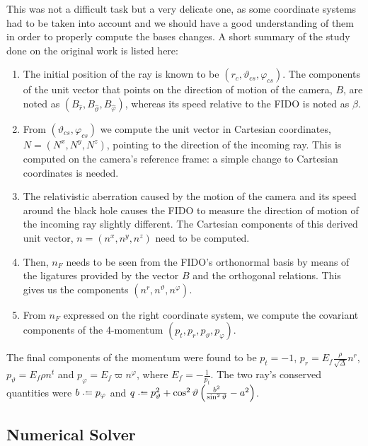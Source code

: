 This was not a difficult task but a very delicate one, as some coordinate systems had to be taken into account and we should have a good understanding of them in order to properly compute the bases changes. A short summary of the study done on the original work is listed here:
\begin{enumerate}
	\item The initial position of the ray is known to be $(r_c, \vartheta_{cs}, \varphi_{cs})$. The components of the unit vector that points on the direction of motion of the camera, $B$, are noted as $(B_{\widehat{r}}, B_{\widehat{\vartheta}}, B_{\widehat{\varphi}})$, whereas its speed relative to the \ac{FIDO} is noted as $\beta$.
	\item From $(\vartheta_{cs}, \varphi_{cs})$ we compute the unit vector in Cartesian coordinates, $N = (N^x, N^y, N^z)$, pointing to the direction of the incoming ray. This is computed on the camera's reference frame: a simple change to Cartesian coordinates is needed.
	\item The relativistic aberration caused by the motion of the camera and its speed around the black hole causes the \ac{FIDO} to measure the direction of motion of the incoming ray slightly different. The Cartesian components of this derived unit vector, $n = (n^x, n^y, n^z)$ need to be computed.
	\item Then, $n_F$ needs to be seen from the \ac{FIDO}'s orthonormal basis by means of the ligatures provided by the vector $B$ and the orthogonal relations. This gives us the components $(n^r, n^\vartheta, n^\varphi)$.
	\item From $n_F$ expressed on the right coordinate system, we compute the covariant components of the 4-momentum $(p_t, p_r, p_\vartheta, p_\varphi)$.
\end{enumerate}


The final components of the momentum \cite[Eq. (A.11)]{thorne15} were found to be $p_t = -1$, $p_r = E_f \frac{\rho}{\sqrt{\Delta}} n^r$, $p_\vartheta = E_f \rho n^t$ and $p_\varphi = E_f \varpi n^\varphi$, where $E_f = - \frac{1}{p_t}$. The two ray's conserved quantities \cite[Eq. (A.12)]{thorne15} were $b \defeq p_\varphi$ and $q \defeq p_\vartheta^2 + \cos^2\vartheta \left( \frac{b^2}{\sin^2\vartheta} - a^2 \right)$.

\subsection{Numerical Solver}
\label{sec:numerical}

